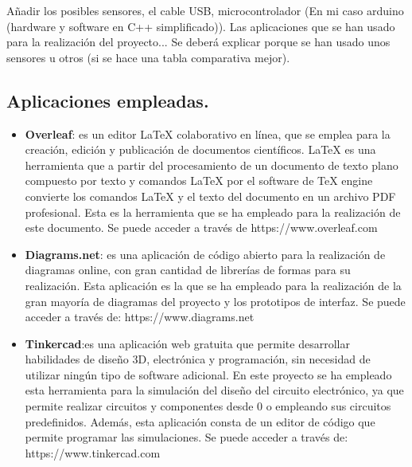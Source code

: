 Añadir los posibles sensores, el cable USB, microcontrolador (En mi caso arduino (hardware y software en C++ simplificado)). Las aplicaciones que se han usado para la realización del proyecto... Se deberá explicar porque se han usado unos sensores u otros (si se hace una tabla comparativa mejor). 


\subsection{Aplicaciones empleadas.}

\begin{itemize}
\item \textbf{Overleaf}\cite{Overleaf}: es un editor LaTeX colaborativo en línea, que se emplea para la creación, edición y publicación de documentos científicos. LaTeX es una herramienta que a partir del procesamiento de un documento de texto plano compuesto por texto y comandos LaTeX por el software de TeX engine convierte los comandos LaTeX y el texto del documento en un archivo PDF profesional. Esta es la herramienta que se ha empleado para la realización de este documento. Se puede acceder a través de https://www.overleaf.com  %

\item \textbf{Diagrams.net}\cite{Diagrams.net}: es una aplicación de código abierto para la realización de diagramas online, con gran cantidad de librerías de formas para su realización. Esta aplicación es la que se ha empleado para la realización de la gran mayoría de diagramas del proyecto y los prototipos de interfaz. Se puede acceder a través de: https://www.diagrams.net %

\item \textbf{Tinkercad}\cite{Tinkercad}:es una aplicación web gratuita que permite desarrollar habilidades de diseño 3D, electrónica y programación, sin necesidad de utilizar ningún tipo de software adicional. En este proyecto se ha empleado esta herramienta para la simulación del diseño del circuito electrónico, ya que permite realizar circuitos y componentes desde 0 o empleando sus circuitos predefinidos. Además, esta aplicación consta de un editor de código que permite programar las simulaciones. Se puede acceder a través de: https://www.tinkercad.com %


\end{itemize}
